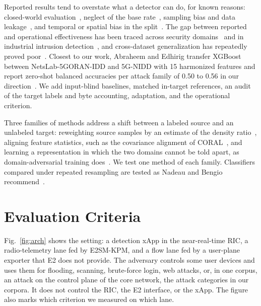 Reported results tend to overstate what a detector can do, for known reasons: closed-world evaluation~\cite{sommer2010outside}, neglect of the base rate~\cite{axelsson2000baserate}, sampling bias and data leakage~\cite{arp2022dosdonts,kapoor2023leakage}, and temporal or spatial bias in the split~\cite{pendlebury2019tesseract}. The gap between reported and operational effectiveness has been traced across security domains~\cite{apruzzese2023role} and in industrial intrusion detection~\cite{kus2022falsesense}, and cross-dataset generalization has repeatedly proved poor~\cite{dhooge2020interdataset,layeghy2022generalisability}. Closest to our work, Abraheem and Edhirig transfer XGBoost between NetsLab-5GORAN-IDD and 5G-NIDD with 15 harmonized features and report zero-shot balanced accuracies per attack family of 0.50 to 0.56 in our direction~\cite{abraheem2026bidirectional}. We add input-blind baselines, matched in-target references, an audit of the target labels and byte accounting, adaptation, and the operational criterion.

Three families of methods address a shift between a labeled source and an unlabeled target: reweighting source samples by an estimate of the density ratio~\cite{shimodaira2000improving,bickel2009discriminative}, aligning feature statistics, such as the covariance alignment of CORAL~\cite{sun2016coral}, and learning a representation in which the two domains cannot be told apart, as domain-adversarial training does~\cite{ganin2016dann}. We test one method of each family. Classifiers compared under repeated resampling are tested as Nadeau and Bengio recommend~\cite{nadeau2003inference}.

\section{Evaluation Criteria}
\label{sec:criteria}

Fig.~\ref{fig:arch} shows the setting: a detection xApp in the near-real-time RIC, a radio-telemetry lane fed by E2SM-KPM, and a flow lane fed by a user-plane exporter that E2 does not provide. The adversary controls some user devices and uses them for flooding, scanning, brute-force login, web attacks, or, in one corpus, an attack on the control plane of the core network, the attack categories in our corpora. It does not control the RIC, the E2 interface, or the xApp. The figure also marks which criterion we measured on which lane.

